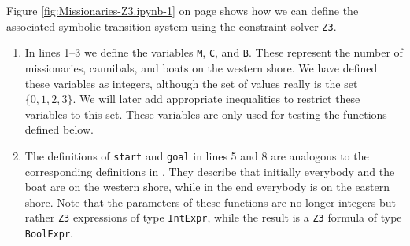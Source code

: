 Figure \ref{fig:Missionaries-Z3.ipynb-1} on page \pageref{fig:Missionaries-Z3.ipynb-1} shows how we can define
the associated symbolic transition system using the constraint solver \texttt{Z3}.
\begin{enumerate}
\item In lines 1--3 we define the variables \texttt{M}, \texttt{C}, and \texttt{B}.  These represent the
      number of missionaries, cannibals, and boats on the western shore.  We have defined these variables as
      integers, although the set of values really is the set $\{0,1,2,3\}$.  We will later add appropriate
      inequalities to restrict these variables to this set.  These variables are only used for testing the
      functions defined below.
\item The definitions of \texttt{start} and \texttt{goal} in lines 5 and 8 are analogous to the corresponding
      definitions in .  They describe that initially everybody and the boat are on
      the western shore, while in the end everybody is on the eastern shore.
      Note that the parameters of these functions are no longer integers but rather \texttt{Z3} expressions of
      type \texttt{IntExpr}, while the result is a \texttt{Z3} formula of type \texttt{BoolExpr}.


\end{enumerate}
